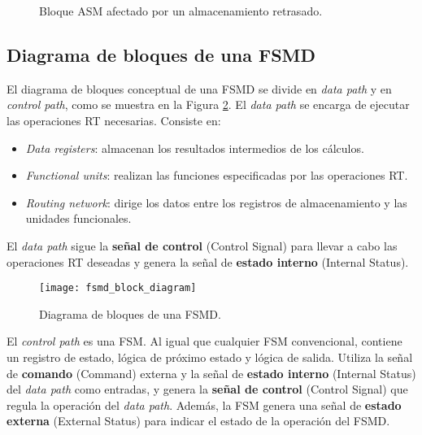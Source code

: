     \begin{figure}[!h]
        \centering
        \caption{Bloque ASM afectado por un almacenamiento retrasado.}
        \label{fig:asm_affected_delay}
    \end{figure}

    \subsection{Diagrama de bloques de una FSMD}

    El diagrama de bloques conceptual de una FSMD se divide en \textit{data path} y en \textit{control path}, como se muestra en la Figura \ref{fig:fsmd_block_diagram}. El \textit{data path} se encarga de ejecutar las operaciones RT necesarias. Consiste en:

    \begin{itemize}
      \item \textit{Data registers}: almacenan los resultados intermedios de los cálculos.
      \item \textit{Functional units}: realizan las funciones especificadas por las operaciones RT.
      \item \textit{Routing network}: dirige los datos entre los registros de almacenamiento y las unidades funcionales.
    \end{itemize}

    El \textit{data path} sigue la \textbf{señal de control} (Control Signal) para llevar a cabo las operaciones RT deseadas y genera la señal de \textbf{estado interno} (Internal Status).

    \begin{figure}[!h]
      \centering
      \texttt{[image: fsmd\_block\_diagram]}
      \caption{Diagrama de bloques de una FSMD.}
      \label{fig:fsmd_block_diagram}
    \end{figure}

    El \textit{control path} es una FSM. Al igual que cualquier FSM convencional, contiene un registro de estado, lógica de próximo estado y lógica de salida. Utiliza la señal de \textbf{comando} (Command) externa y la señal de \textbf{estado interno} (Internal Status) del \textit{data path} como entradas, y genera la \textbf{señal de control} (Control Signal) que regula la operación del \textit{data path}. Además, la FSM genera una señal de \textbf{estado externa} (External Status) para indicar el estado de la operación del FSMD.

